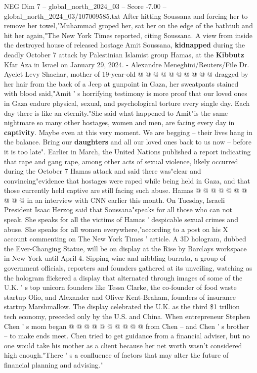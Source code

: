 \begin{textsample}{NEG Dim 7 – global\_north\_2024\_03 – Score -7.00 – global\_north\_2024\_03/107009585.txt}
After hitting Soussana and forcing her to remove her towel,"Muhammad groped her, sat her on the edge of the bathtub and hit her again,"The New York Times reported, citing Soussana.
A view from inside the destroyed house of released hostage Amit Soussana, \textbf{kidnapped} during the deadly October 7 attack by Palestinian Islamist group Hamas, at the \textbf{Kibbutz} Kfar Aza in Israel on January 29, 2024. - Alexandre Meneghini/Reuters/File Dr.
Ayelet Levy Shachar, mother of 19-year-old @ @ @ @ @ @ @ @ @ @ dragged by her hair from the back of a Jeep at gunpoint in Gaza, her sweatpants stained with blood said,"Amit ' s horrifying testimony is more proof that our loved ones in Gaza endure physical, sexual, and psychological torture every single day.
Each day there is like an eternity."She said what happened to Amit"is the same nightmare so many other hostages, women and men, are facing every day in \textbf{captivity}.
Maybe even at this very moment.
We are begging -- their lives hang in the balance.
Bring our \textbf{daughters} and all our loved ones back to us now -- before it is too late".
Earlier in March, the United Nations published a report indicating that rape and gang rape, among other acts of sexual violence, likely occurred during the October 7 Hamas attack and said there was"clear and convincing"evidence that hostages were raped while being held in Gaza, and that those currently held captive are still facing such abuse.
Hamas @ @ @ @ @ @ @ @ @ @ in an interview with CNN earlier this month.
On Tuesday, Israeli President Isaac Herzog said that Soussana"speaks for all those who can not speak.
She speaks for all the victims of Hamas ' despicable sexual crimes and abuse.
She speaks for all women everywhere,"according to a post on his X account commenting on The New York Times ' article.
A 3D hologram, dubbed the Ever-Changing Statue, will be on display at the Rise by Barclays workspace in New York until April 4.
Sipping wine and nibbling burrata, a group of government officials, reporters and founders gathered at its unveiling, watching as the hologram flickered a display that alternated through images of some of the U.K. ' s top unicorn founders like Tessa Clarke, the co-founder of food waste startup Olio, and Alexander and Oliver Kent-Braham, founders of insurance startup Marshmallow.
The display celebrated the U.K. as the third \$1 trillion tech economy, preceded only by the U.S. and China.
When entrepreneur Stephen Chen ' s mom began @ @ @ @ @ @ @ @ @ @ from Chen -- and Chen ' s brother -- to make ends meet.
Chen tried to get guidance from a financial adviser, but no one would take his mother as a client because her net worth wasn't considered high enough."There ' s a confluence of factors that may alter the future of financial planning and advising."

\end{textsample}
